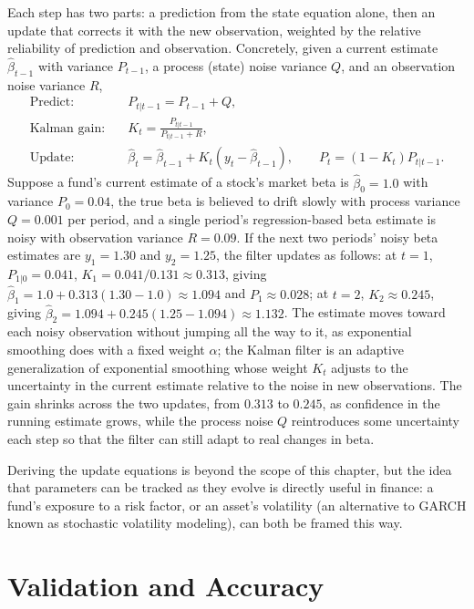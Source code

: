 \documentclass[../ai_in_finance]{subfiles}
\begin{document}
Each step has two parts: a prediction from the state equation alone, then an update that corrects it with the new observation, weighted by the relative reliability of prediction and observation. Concretely, given a current estimate $\hat\beta_{t-1}$ with variance $P_{t-1}$, a process (state) noise variance $Q$, and an observation noise variance $R$,
\begin{align*}
\text{Predict:} \quad & P_{t|t-1} = P_{t-1} + Q, \\
\text{Kalman gain:} \quad & K_t = \frac{P_{t|t-1}}{P_{t|t-1} + R}, \\
\text{Update:} \quad & \hat\beta_t = \hat\beta_{t-1} + K_t (y_t - \hat\beta_{t-1}), \qquad P_t = (1-K_t) P_{t|t-1}.
\end{align*}
Suppose a fund's current estimate of a stock's market beta is $\hat\beta_0 = 1.0$ with variance $P_0=0.04$, the true beta is believed to drift slowly with process variance $Q=0.001$ per period, and a single period's regression-based beta estimate is noisy with observation variance $R=0.09$. If the next two periods' noisy beta estimates are $y_1=1.30$ and $y_2=1.25$, the filter updates as follows: at $t=1$, $P_{1|0}=0.041$, $K_1 = 0.041/0.131 \approx 0.313$, giving $\hat\beta_1 = 1.0 + 0.313(1.30-1.0) \approx 1.094$ and $P_1 \approx 0.028$; at $t=2$, $K_2 \approx 0.245$, giving $\hat\beta_2 = 1.094 + 0.245(1.25 - 1.094) \approx 1.132$. The estimate moves toward each noisy observation without jumping all the way to it, as exponential smoothing does with a fixed weight $\alpha$; the Kalman filter is an adaptive generalization of exponential smoothing whose weight $K_t$ adjusts to the uncertainty in the current estimate relative to the noise in new observations. The gain shrinks across the two updates, from $0.313$ to $0.245$, as confidence in the running estimate grows, while the process noise $Q$ reintroduces some uncertainty each step so that the filter can still adapt to real changes in beta.

Deriving the update equations is beyond the scope of this chapter, but the idea that parameters can be tracked as they evolve is directly useful in finance: a fund's exposure to a risk factor, or an asset's volatility (an alternative to GARCH known as stochastic volatility modeling), can both be framed this way.

\section{Validation and Accuracy}
\end{document}
